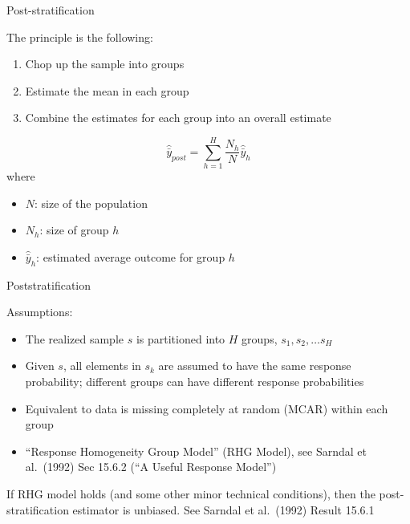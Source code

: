 \documentclass[aspectratio=169]{beamer}
\begin{document}
\begin{frame}{Post-stratification}

The principle is the following:
\begin{enumerate}
\item Chop up the sample into groups \pause
\item Estimate the mean in each group \pause
\item Combine the estimates for each group into an overall estimate
\end{enumerate}
\pause

\vfill

\begin{equation*}
\hat{\bar{y}}_{post} = \sum_{h=1}^H \frac{N_h}{N} \hat{\bar{y}}_h
\end{equation*}
where 
\begin{itemize}
\item $N$: size of the population
\item $N_h$: size of group $h$
\item $\hat{\bar{y}}_h$: estimated average outcome for group $h$
\end{itemize}

\end{frame}
\begin{frame}{Poststratification}

Assumptions:
\begin{itemize}
\item The realized sample $s$ is partitioned into $H$ groups, $s_1, s_2, \ldots s_H$
\item Given $s$, all elements in $s_k$ are assumed to have the same response probability; different groups can have different response probabilities
\item Equivalent to data is missing completely at random (MCAR) within each group
\item ``Response Homogeneity Group Model'' (RHG Model), see Sarndal et al.\ (1992) Sec 15.6.2 (``A Useful Response Model'')
\end{itemize}

\vfill
If RHG model holds (and some other minor technical conditions), then the post-stratification estimator is unbiased. See Sarndal et al.\ (1992) Result 15.6.1 

\end{frame}
\end{document}
